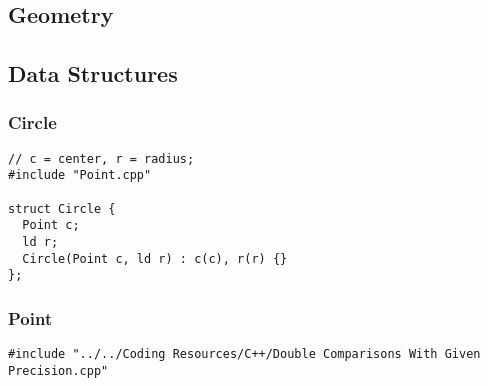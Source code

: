 \documentclass[twoside]{article}
\begin{document}
\begin{multicols*}{2}
\sectionfont{\bfseries\sffamily\centering\Huge}
\vspace{1em}
\section*{Geometry}
\vspace{3em}
\subsectionfont{\bfseries\sffamily\centering\LARGE}
\vspace{0em}
\subsection*{Data Structures}
\vspace{2em}
\subsubsectionfont{\large\bfseries\sffamily\underline}
\subsubsection*{Circle}
\begin{verbatim}
// c = center, r = radius;
#include "Point.cpp"

struct Circle {
  Point c;
  ld r;
  Circle(Point c, ld r) : c(c), r(r) {}
};
\end{verbatim}

\subsubsectionfont{\large\bfseries\sffamily\underline}
\subsubsection*{Point}
\begin{verbatim}
#include "../../Coding Resources/C++/Double Comparisons With Given Precision.cpp"


\end{verbatim}
\end{multicols*}
\end{document}
